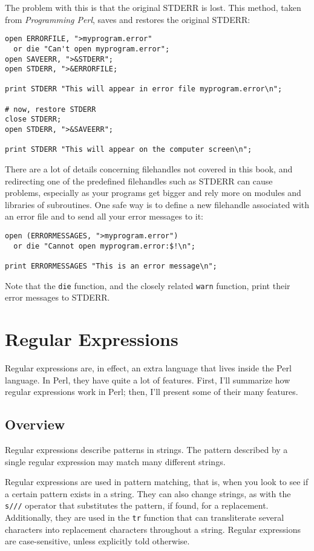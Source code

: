 The problem with this is that the original STDERR is lost. This method, taken from \textit{Programming Perl}, saves and restores the original STDERR:

\begin{lstlisting}
open ERRORFILE, ">myprogram.error" 
  or die "Can't open myprogram.error";
open SAVEERR, ">&STDERR";
open STDERR, ">&ERRORFILE;

print STDERR "This will appear in error file myprogram.error\n";

# now, restore STDERR 
close STDERR;
open STDERR, ">&SAVEERR";

print STDERR "This will appear on the computer screen\n";
\end{lstlisting}

There are a lot of details concerning filehandles not covered in this book, and redirecting one of the predefined filehandles such as STDERR can cause problems, especially as your programs get bigger and rely more on modules and libraries of subroutines. One safe way is to define a new filehandle associated with an error file and to send all your error messages to it:

\begin{lstlisting}
open (ERRORMESSAGES, ">myprogram.error") 
  or die "Cannot open myprogram.error:$!\n";

print ERRORMESSAGES "This is an error message\n";
\end{lstlisting}

Note that the \verb|die| function, and the closely related \verb|warn| function, print their error messages to STDERR.

\section{Regular Expressions}
Regular expressions are, in effect, an extra language that lives inside the Perl language. In Perl, they have quite a lot of features. First, I'll summarize how regular expressions work in Perl; then, I'll present some of their many features.

\subsection{Overview}
Regular expressions describe patterns in strings. The pattern described by a single regular expression may match many different strings.

Regular expressions are used in pattern matching, that is, when you look to see if a certain pattern exists in a string. They can also change strings, as with the \verb|s///| operator that substitutes the pattern, if found, for a replacement. Additionally, they are used in the \verb|tr| function that can transliterate several characters into replacement characters throughout a string. Regular expressions are case-sensitive, unless explicitly told otherwise.

